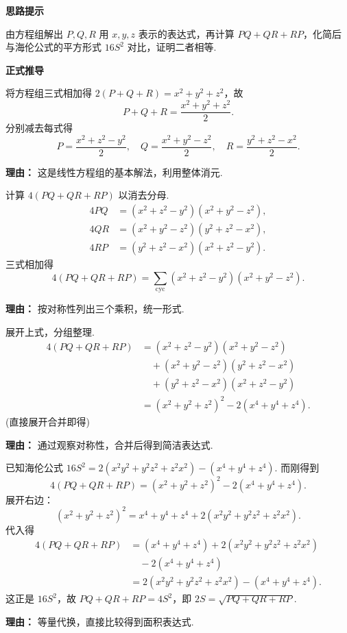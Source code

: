 ﻿\begin{proofbox}

\textbf{\textcolor{CProof}{思路提示}}

由方程组解出 $P,Q,R$ 用 $x,y,z$ 表示的表达式，再计算 $PQ+QR+RP$，化简后与海伦公式的平方形式 $16S^2$ 对比，证明二者相等.

\medskip
\textbf{\textcolor{CProof}{正式推导}}
\begin{description}[style=nextline, leftmargin=2.8em, labelsep=0.5em, itemsep=0.55em]
    \item[\textbf{步骤一（解出辅助量）：}] 将方程组三式相加得 $2(P+Q+R)=x^2+y^2+z^2$，故
    \[
    P+Q+R = \frac{x^2+y^2+z^2}{2}.
    \]
    分别减去每式得
    \[
    P = \frac{x^2+z^2-y^2}{2},\quad
    Q = \frac{x^2+y^2-z^2}{2},\quad
    R = \frac{y^2+z^2-x^2}{2}.
    \]
    \par\textbf{理由：} 这是线性方程组的基本解法，利用整体消元.

    \item[\textbf{步骤二（计算乘积和）：}] 计算 $4(PQ+QR+RP)$ 以消去分母.
    \[
    \begin{aligned}
    4PQ &= (x^2+z^2-y^2)(x^2+y^2-z^2),\\
    4QR &= (x^2+y^2-z^2)(y^2+z^2-x^2),\\
    4RP &= (y^2+z^2-x^2)(x^2+z^2-y^2).
    \end{aligned}
    \]
    三式相加得
    \[
    4(PQ+QR+RP) = \sum_{\text{cyc}} (x^2+z^2-y^2)(x^2+y^2-z^2).
    \]
    \par\textbf{理由：} 按对称性列出三个乘积，统一形式.

    \item[\textbf{步骤三（化简代数和）：}] 展开上式，分组整理.
    \[
    \begin{aligned}
    4(PQ+QR+RP)
    &= (x^2+z^2-y^2)(x^2+y^2-z^2) \\
    &\quad + (x^2+y^2-z^2)(y^2+z^2-x^2) \\
    &\quad + (y^2+z^2-x^2)(x^2+z^2-y^2) \\
    &= (x^2+y^2+z^2)^2 - 2(x^4+y^4+z^4).
    \end{aligned}
    \]
    (直接展开合并即得)
    \par\textbf{理由：} 通过观察对称性，合并后得到简洁表达式.

    \item[\textbf{步骤四（对比海伦公式）：}] 已知海伦公式 $16S^2 = 2(x^2y^2+y^2z^2+z^2x^2) - (x^4+y^4+z^4)$. 而刚得到
    \[
    4(PQ+QR+RP) = (x^2+y^2+z^2)^2 - 2(x^4+y^4+z^4).
    \]
    展开右边：
    \[
    (x^2+y^2+z^2)^2 = x^4+y^4+z^4 + 2(x^2y^2+y^2z^2+z^2x^2).
    \]
    代入得
    \[
    \begin{aligned}
    4(PQ+QR+RP)
    &= (x^4+y^4+z^4) + 2(x^2y^2+y^2z^2+z^2x^2) \\
    &\quad - 2(x^4+y^4+z^4) \\
    &= 2(x^2y^2+y^2z^2+z^2x^2) - (x^4+y^4+z^4).
    \end{aligned}
    \]
    这正是 $16S^2$，故 $PQ+QR+RP = 4S^2$，即 $2S = \sqrt{PQ+QR+RP}$.
    \par\textbf{理由：} 等量代换，直接比较得到面积表达式.
\end{description}


\end{proofbox}
